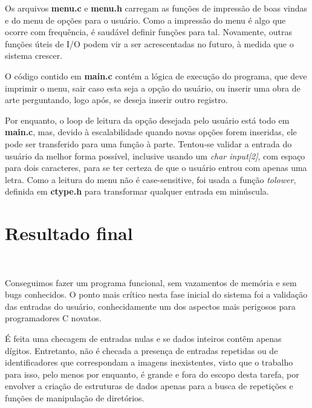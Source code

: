 \documentclass{article}
\begin{document}
Os arquivos \textbf{menu.c} e \textbf{menu.h} carregam as funções de impressão de boas vindas e do menu de opções para o usuário. Como a impressão do menu é algo que ocorre com frequência, é saudável definir funções para tal. Novamente, outras funções úteis de I/O podem vir a ser acrescentadas no futuro, à medida que o sistema crescer.

O código contido em \textbf{main.c} contém a lógica de execução do programa, que deve imprimir o menu, sair caso esta seja a opção do usuário, ou inserir uma obra de arte perguntando, logo após, se deseja inserir outro registro.

Por enquanto, o loop de leitura da opção desejada pelo usuário está todo em \textbf{main.c}, mas, devido à escalabilidade quando novas opções forem inseridas, ele pode ser transferido para uma função à parte. Tentou-se validar a entrada do usuário da melhor forma possível, inclusive usando um \textit{char input[2]}, com espaço para dois caracteres, para se ter certeza de que o usuário entrou com apenas uma letra. Como a leitura do menu não é case-sensitive, foi usada a função \textit{tolower}, definida em \textbf{ctype.h} para transformar qualquer entrada em minúscula.

\section{Resultado final}\

Conseguimos fazer um programa funcional, sem vazamentos de memória e sem bugs conhecidos. O ponto mais crítico nesta fase inicial do sistema foi a validação das entradas do usuário, conhecidamente um dos aspectos mais perigosos para programadores C novatos.

É feita uma checagem de entradas nulas e se dados inteiros contêm apenas dígitos. Entretanto, não é checada a presença de entradas repetidas ou de identificadores que correspondam a imagens inexistentes, visto que o trabalho para isso, pelo menos por enquanto, é grande e fora do escopo desta tarefa, por envolver a criação de estruturas de dados apenas para a busca de repetições e funções de manipulação de diretórios.
\end{document}
